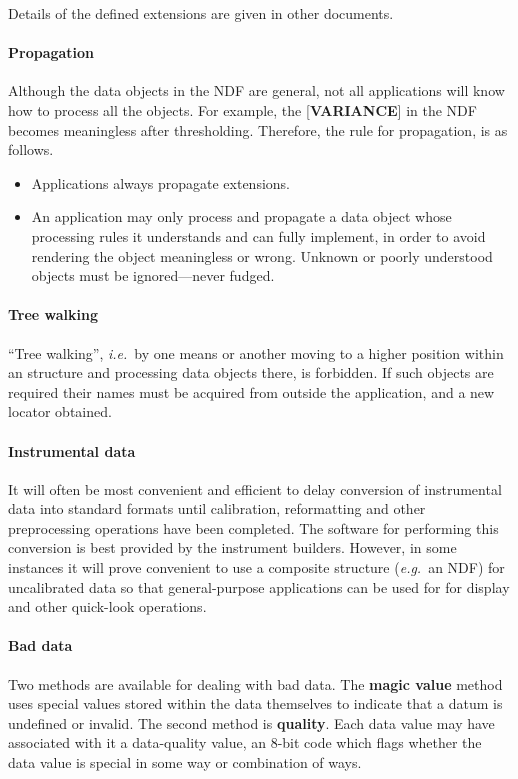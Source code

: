 Details of the defined extensions are given in other documents.

\paragraph{Propagation}
Although the data objects in the NDF are general, not all applications
will know how to process all the objects.  For example, the {[}{\bf VARIANCE}{]}
in the NDF becomes meaningless after thresholding.
Therefore, the rule for propagation,
is as follows.
\begin{itemize}
\item
Applications always propagate extensions.
\item
An application may only process and
propagate a data object whose processing rules it understands
and can fully implement, in order to avoid
rendering the object meaningless or wrong. Unknown or poorly
understood objects must be ignored---never fudged.
\end{itemize}

\paragraph{Tree walking}
``Tree walking'', {\it i.e.}\  by one means or another moving to a higher
position within an structure and processing data objects there, is
forbidden. If such objects are required their names must be acquired
from outside the application, and a new locator obtained. 

\paragraph{Instrumental data}
It will often be most convenient and efficient to delay conversion of
instrumental
data into standard formats until calibration,
reformatting and other preprocessing operations have been
completed.  The software for performing this
conversion is best provided by the
instrument builders.
However, in some instances it will prove
convenient to use a composite structure ({\it e.g.}\
an NDF) for uncalibrated data so that
general-purpose applications can be used for
for display and other quick-look operations.

\paragraph{Bad data}
Two methods are available for dealing with bad data.  The
{\bf magic value} method uses special values
stored within the data themselves to
indicate that a datum is undefined or invalid.  The second method is
{\bf quality}.  Each data value may have associated with
it a data-quality value, an 8-bit
code which flags whether the data value is special
in some way or combination of ways.

